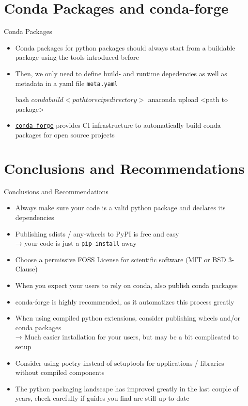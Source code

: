 
\section{Conda Packages and conda-forge}

\begin{frame}[c, fragile]{Conda Packages}
  \begin{itemize}
    \item Conda packages for python packages should always start from a buildable package using the tools introduced before
    \item Then, we only need to define build- and runtime depedencies as well as metadata in a yaml file \texttt{meta.yaml}
      \begin{code}{bash}
        $ conda build <path to recipe directory>
        $ anaconda upload <path to package>
      \end{code}
    \item \href{https://conda-forge.org/}{\texttt{conda-forge}} provides CI infrastructure to automatically build conda packages for open source projects
  \end{itemize}
\end{frame}

\section{Conclusions and Recommendations}

\begin{frame}[c]{Conclusions and Recommendations}
  \begin{itemize}
    \item Always make sure your code is a valid python package and declares its dependencies
    \item Publishing sdists / any-wheels to PyPI is free and easy \\
      → your code is just a \texttt{pip install} away
    \item Choose a permissive FOSS License for scientific software (MIT or BSD 3-Clause)
    \item When you expect your users to rely on conda, also publish conda packages
    \item conda-forge is highly recommended, as it automatizes this process greatly
    \item When using compiled python extensions, consider publishing wheels and/or conda packages \\
      → Much easier installation for your users, but may be a bit complicated to setup
    \item Consider using poetry instead of setuptools for applications / libraries without compiled components
    \item The python packaging landscape has improved greatly in the last couple of years, check carefully if guides
      you find are still up-to-date
  \end{itemize}
\end{frame}

